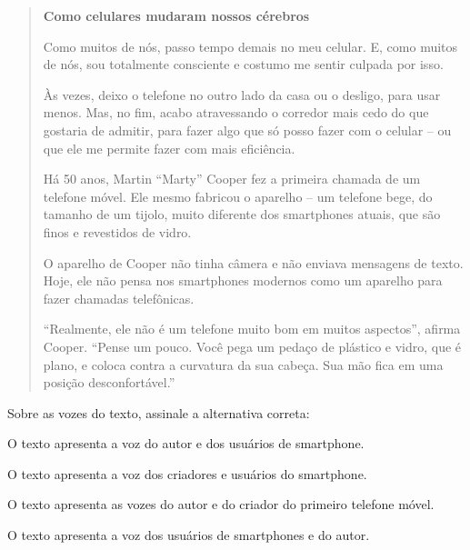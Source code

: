 \begin{quote}

\textbf{Como celulares mudaram nossos cérebros}

Como muitos de nós, passo tempo demais no meu celular. E, como muitos de
nós, sou totalmente consciente e costumo me sentir culpada por isso.

Às vezes, deixo o telefone no outro lado da casa ou o desligo, para usar
menos. Mas, no fim, acabo atravessando o corredor mais cedo do que
gostaria de admitir, para fazer algo que só posso fazer com o celular --
ou que ele me permite fazer com mais eficiência.

Há 50 anos, Martin ``Marty'' Cooper fez a primeira chamada de um
telefone móvel. Ele mesmo fabricou o aparelho -- um telefone bege, do
tamanho de um tijolo, muito diferente dos smartphones atuais, que são
finos e revestidos de vidro.

O aparelho de Cooper não tinha câmera e não enviava mensagens de texto.
Hoje, ele não pensa nos smartphones modernos como um aparelho
para fazer chamadas telefônicas.

``Realmente, ele não é um telefone muito bom em muitos aspectos'',
afirma Cooper. ``Pense um pouco. Você pega um pedaço de plástico e
vidro, que é plano, e coloca contra a curvatura da sua cabeça. Sua mão
fica em uma posição desconfortável.''

\end{quote}


Sobre as vozes do texto, assinale a alternativa correta:

\begin{escolha}
  
  \item O texto apresenta a voz do autor e dos usuários de smartphone.
  
  \item O texto apresenta a voz dos criadores e usuários do smartphone.
  
  \item O texto apresenta as vozes do autor e do criador do primeiro telefone móvel.
  
  \item O texto apresenta a voz dos usuários de smartphones e do autor.

\end{escolha}


